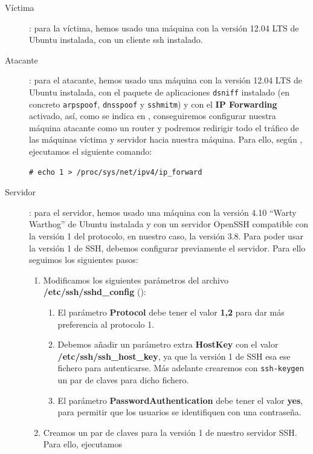 \documentclass[10pt,a4paper,spanish]{article}
\begin{document}
\begin{description}
    \item[Víctima]: para la víctima, hemos usado una máquina con la versión 12.04 LTS de Ubuntu instalada, con un cliente ssh instalado.
    \item[Atacante]: para el atacante, hemos usado una máquina con la versión 12.04 LTS de Ubuntu instalada, con el paquete de aplicaciones \texttt{dsniff} instalado (en concreto \texttt{arpspoof}, \texttt{dnsspoof} y \texttt{sshmitm}) y con el \textbf{IP Forwarding} activado, así, como se indica en \cite{barcelona}, conseguiremos configurar nuestra máquina atacante como un router y podremos redirigir todo el tráfico de las máquinas víctima y servidor hacia nuestra máquina. Para ello, según \cite{enableipf}, ejecutamos el siguiente comando:

\begin{verbatim}
# echo 1 > /proc/sys/net/ipv4/ip_forward
\end{verbatim}

    \item[Servidor]: para el servidor, hemos usado una máquina con la versión 4.10 ``Warty Warthog'' de Ubuntu instalada y con un servidor OpenSSH compatible con la versión 1 del protocolo, en nuestro caso, la versión 3.8. Para poder usar la versión 1 de SSH, debemos configurar previamente el servidor. Para ello seguimos los siguientes pasos:
    \begin{enumerate}[1.]
        \item Modificamos los siguientes parámetros del archivo \textbf{/etc/ssh/sshd\_config} (\cite{sshd}):
        \begin{enumerate}[$\bullet$]
            \item El parámetro \textbf{Protocol} debe tener el valor \textbf{1,2} para dar más preferencia al protocolo 1.
            \item Debemos añadir un parámetro extra \textbf{HostKey} con el valor \textbf{/etc/ssh/ssh\_host\_key}, ya que la versión 1 de SSH esa ese fichero para autenticarse. Más adelante crearemos con \texttt{ssh-keygen} un par de claves para dicho fichero.
            \item El parámetro \textbf{PasswordAuthentication} debe tener el valor \textbf{yes}, para permitir que los usuarios se identifiquen con una contraseña.
        \end{enumerate}
        \item Creamos un par de claves para la versión 1 de nuestro servidor SSH. Para ello, ejecutamos
    \end{enumerate}
\end{description}
\end{document}
